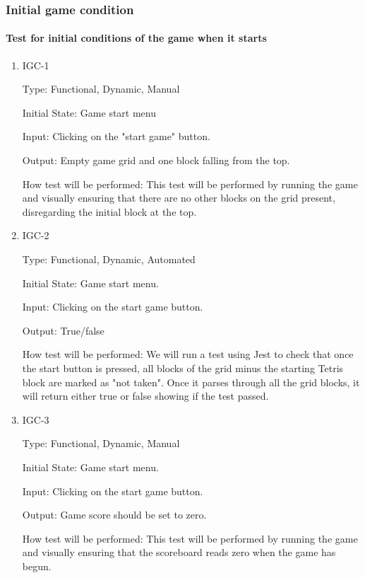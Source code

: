 \documentclass[12pt, titlepage]{article}
\begin{document}
\subsubsection{Initial game condition}
\paragraph{Test for initial conditions of the game when it starts}

\begin{enumerate}

\item{IGC-1\\}

Type: Functional, Dynamic, Manual
					
Initial State: Game start menu
					
Input: Clicking on the "start game" button.
					
Output: Empty game grid and one block falling from the top.
					
How test will be performed: This test will be performed by running the game and visually ensuring that there are no other blocks on the grid present, disregarding the initial block at the top.


\item{IGC-2\\}

Type: Functional, Dynamic, Automated
					
Initial State: Game start menu.
					
Input: Clicking on the start game button.
					
Output: True/false
					
How test will be performed: We will run a test using Jest to check that once the start button is pressed, all blocks of the grid minus the starting Tetris block are marked as "not taken". Once it parses through all the grid blocks, it will return either true or false showing if the test passed.

\item{IGC-3\\}

Type: Functional, Dynamic, Manual
					
Initial State: Game start menu.
					
Input: Clicking on the start game button.
					
Output: Game score should be set to zero.
					
How test will be performed:  This test will be performed by running the game and visually ensuring that the scoreboard reads zero when the game has begun.


\end{enumerate}
\end{document}
